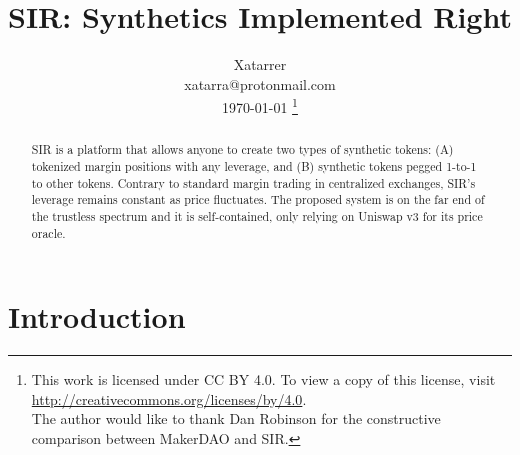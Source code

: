 \documentclass[journal,letterpaper,oneside,onecolumn,12pt]{IEEEtran}
\begin{document}
	
	\title{
		SIR: Synthetics Implemented Right
	}
	
	
	\author{
		Xatarrer \\
		xatarra@protonmail.com \\
		\today{}
		\thanks{This work is licensed under CC BY 4.0. To view a copy of this license, visit \url{http://creativecommons.org/licenses/by/4.0}.\\
		The author would like to thank Dan Robinson for the constructive comparison between MakerDAO and SIR.}
	}
	
	\maketitle
	
	\begin{abstract}
		SIR is a platform that allows anyone to create two types of synthetic tokens: (A) tokenized margin positions with any leverage, and (B) synthetic tokens pegged 1-to-1 to other tokens. Contrary to standard margin trading in centralized exchanges, SIR's leverage remains constant as price fluctuates.
		The proposed system is on the far end of the trustless spectrum and it is self-contained, only relying on Uniswap v3 for its price oracle.
	\end{abstract}


	\section{Introduction}
	
\end{document}
